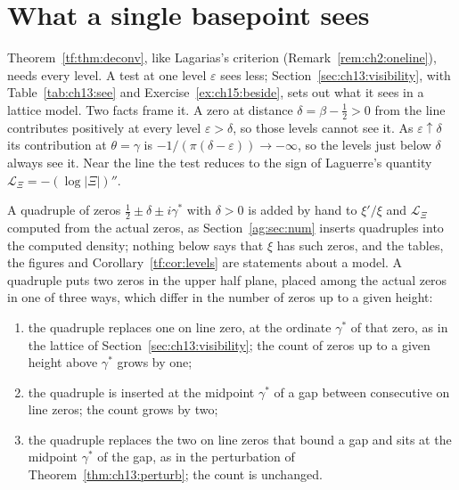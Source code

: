\section{What a single basepoint sees}\label{tf:sec:window}

Theorem~\ref{tf:thm:deconv}, like Lagarias's criterion \cite{Lagarias} (Remark~\ref{rem:ch2:oneline}), needs every level. A test at one level $\varepsilon$ sees less; Section~\ref{sec:ch13:visibility}, with Table~\ref{tab:ch13:see} and Exercise~\ref{ex:ch15:beside}, sets out what it sees in a lattice model. Two facts frame it. A zero at distance $\delta=\beta-\tfrac12>0$ from the line contributes positively at every level $\varepsilon>\delta$, so those levels cannot see it. As $\varepsilon\uparrow\delta$ its contribution at $\theta=\gamma$ is $-1/(\pi(\delta-\varepsilon))\to-\infty$, so the levels just below $\delta$ always see it. Near the line the test reduces to the sign of Laguerre's quantity $\mathcal L_\Xi=-(\log|\Xi|)''$.

A quadruple of zeros $\tfrac12\pm\delta\pm i\gamma^*$ with $\delta>0$ is added by hand to $\xi'/\xi$ and $\mathcal L_\Xi$ computed from the actual zeros, as Section~\ref{ag:sec:num} inserts quadruples into the computed density; nothing below says that $\xi$ has such zeros, and the tables, the figures and Corollary~\ref{tf:cor:levels} are statements about a model. A quadruple puts two zeros in the upper half plane, placed among the actual zeros in one of three ways, which differ in the number of zeros up to a given height:
\begin{enumerate}
\item[(i)] the quadruple replaces one on line zero, at the ordinate $\gamma^*$ of that zero, as in the lattice of Section~\ref{sec:ch13:visibility}; the count of zeros up to a given height above $\gamma^*$ grows by one;
\item[(ii)] the quadruple is inserted at the midpoint $\gamma^*$ of a gap between consecutive on line zeros; the count grows by two;
\item[(iii)] the quadruple replaces the two on line zeros that bound a gap and sits at the midpoint $\gamma^*$ of the gap, as in the perturbation of Theorem~\ref{thm:ch13:perturb}; the count is unchanged.
\end{enumerate}


